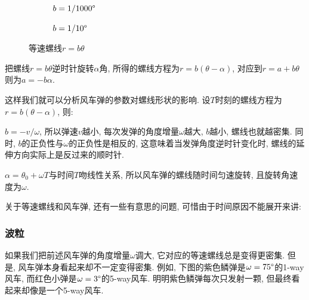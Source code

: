 \begin{figure}[htbp]
  \centering
  \begin{subfigure}{0.49\textwidth}
    \centering
    \caption{$b=1/1000\degree$}
    \label{subfig:spiral-1}
  \end{subfigure}
  \begin{subfigure}{0.49\textwidth}
    \centering
    \caption{$b=1/10\degree$}
    \label{subfig:spiral-2}
  \end{subfigure}
  \caption{等速螺线$r=b\theta$}
\end{figure}

把螺线$r=b\theta$逆时针旋转$\alpha$角,
所得的螺线方程为$r=b(\theta-\alpha)$,
对应到$r=a+b\theta$则为$a=-b\alpha$.

这样我们就可以分析风车弹的参数对螺线形状的影响.
设$T$时刻的螺线方程为$r=b(\theta-\alpha)$, 则:

$b=-v/\omega$, 所以弹速$v$越小, 每次发弹的角度增量$\omega$越大,
$b$越小, 螺线也就越密集. 同时, $b$的正负性与$\omega$的正负性是相反的,
这意味着当发弹角度逆时针变化时, 螺线的延伸方向实际上是反过来的顺时针.

$\alpha=\theta_0+\omega T$与时间$T$吻线性关系,
所以风车弹的螺线随时间匀速旋转, 且旋转角速度为$\omega$.

关于等速螺线和风车弹, 还有一些有意思的问题, 可惜由于时间原因不能展开来讲:

\subsubsection{波粒}

如果我们把前述风车弹的角度增量$\omega$调大,
它对应的等速螺线总是变得更密集. 但是,
风车弹本身看起来却不一定变得密集.
例如, 下图的紫色鳞弹是$\omega=75\degree$的1-way风车,
而红色小弹是$\omega=3\degree$的5-way风车.
明明紫色鳞弹每次只发射一颗, 但最终看起来却像是一个5-way风车.

